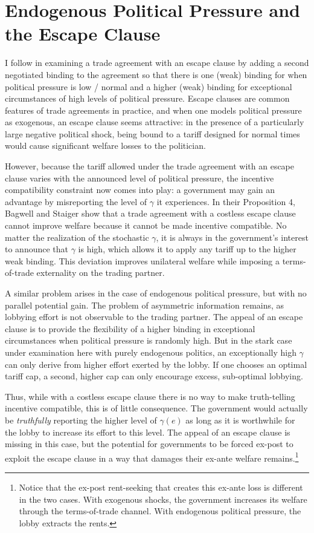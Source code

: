 \documentclass[12pt]{article}
\newcommand{\ga}{\gamma}
\begin{document}
\section{Endogenous Political Pressure and the Escape Clause}
\label{sec:escape}
I follow \Textcite{bs2005} in examining a trade agreement with an escape clause by adding a second negotiated binding to the agreement so that there is one (weak) binding for when political pressure is low / normal and a higher (weak) binding for exceptional circumstances of high levels of political pressure. Escape clauses are common features of trade agreements in practice, and when one models political pressure as exogenous, an escape clause seems attractive: in the presence of a particularly large negative political shock, being bound to a tariff designed for normal times would cause significant welfare losses to the politician.

However, because the tariff allowed under the trade agreement with an escape clause varies with the announced level of political pressure, the incentive compatibility constraint now comes into play: a government may gain an advantage by misreporting the level of $\ga$ it experiences. In their Proposition 4, Bagwell and Staiger show that a trade agreement with a costless escape clause cannot improve welfare because it cannot be made incentive compatible. No matter the realization of the stochastic $\ga$, it is always in the government's interest to announce that $\ga$ is high, which allows it to apply any tariff up to the higher weak binding. This deviation improves unilateral welfare while imposing a terms-of-trade externality on the trading partner.

A similar problem arises in the case of endogenous political pressure, but with no parallel potential gain. The problem of asymmetric information remains, as lobbying effort is not observable to the trading partner. The appeal of an escape clause is to provide the flexibility of a higher binding in exceptional circumstances when political pressure is randomly high. But in the stark case under examination here with purely endogenous politics, an exceptionally high $\ga$ can only derive from higher effort exerted by the lobby. If one chooses an optimal tariff cap, a second, higher cap can only encourage excess, sub-optimal lobbying.

Thus, while with a costless escape clause there is no way to make truth-telling incentive compatible, this is of little consequence. The government would actually be \textit{truthfully} reporting the higher level of $\ga(e)$ as long as it is worthwhile for the lobby to increase its effort to this level. The appeal of an escape clause is missing in this case, but the potential for governments to be forced ex-post to exploit the escape clause in a way that damages their ex-ante welfare remains.\footnote{Notice that the ex-post rent-seeking that creates this ex-ante loss is different in the two cases. With exogenous shocks, the government increases its welfare through the terms-of-trade channel. With endogenous political pressure, the lobby extracts the rents.}
\end{document}
